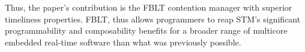 \documentclass[conference,letterpaper]{IEEEtran}
\begin{document}
Thus, the paper's contribution is the FBLT contention manager with superior timeliness properties. FBLT, thus allows programmers to reap STM's significant programmability and composability benefits for a broader range of multicore embedded real-time software than what was previously possible.
%

\end{document}
